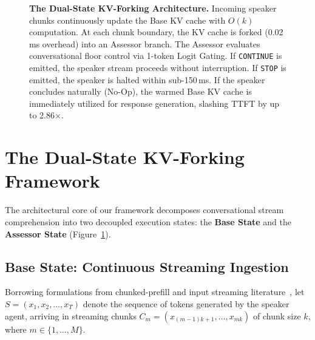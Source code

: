\documentclass{article}
\begin{document}
\begin{figure}[t]
{%
}
\caption{\textbf{The Dual-State KV-Forking Architecture.} Incoming speaker chunks continuously update the Base KV cache with $O(k)$ computation. At each chunk boundary, the KV cache is forked (0.02\,ms overhead) into an Assessor branch. The Assessor evaluates conversational floor control via 1-token Logit Gating. If \texttt{CONTINUE} is emitted, the speaker stream proceeds without interruption. If \texttt{STOP} is emitted, the speaker is halted within sub-150\,ms. If the speaker concludes naturally (No-Op), the warmed Base KV cache is immediately utilized for response generation, slashing TTFT by up to 2.86$\times$.}
\label{fig:dual_state_arch}
\end{figure}

\section{The Dual-State KV-Forking Framework}

The architectural core of our framework decomposes conversational stream comprehension into two decoupled execution states: the \textbf{Base State} and the \textbf{Assessor State} (Figure~\ref{fig:dual_state_arch}).

\subsection{Base State: Continuous Streaming Ingestion}
Borrowing formulations from chunked-prefill and input streaming literature~\citep{xiao2023streamingllm, agrawal2023sarathi}, let $S = (x_1, x_2, \dots, x_T)$ denote the sequence of tokens generated by the speaker agent, arriving in streaming chunks $C_m = (x_{(m-1)k + 1}, \dots, x_{mk})$ of chunk size $k$, where $m \in \{1, \dots, M\}$.
\end{document}
